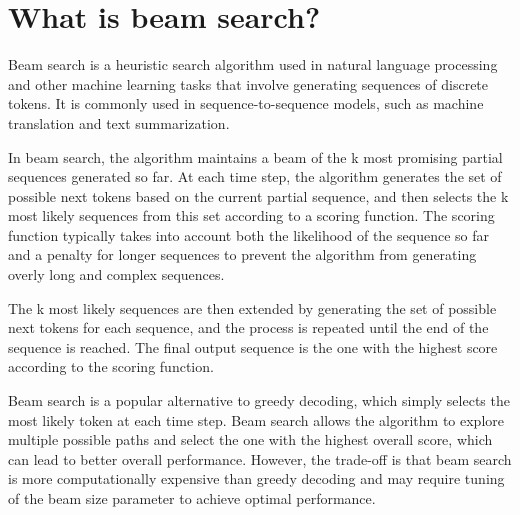\section{What is beam search?}
Beam search is a heuristic search algorithm used in natural language processing and other machine learning tasks that involve generating sequences of discrete tokens. It is commonly used in sequence-to-sequence models, such as machine translation and text summarization.

In beam search, the algorithm maintains a beam of the k most promising partial sequences generated so far. At each time step, the algorithm generates the set of possible next tokens based on the current partial sequence, and then selects the k most likely sequences from this set according to a scoring function. The scoring function typically takes into account both the likelihood of the sequence so far and a penalty for longer sequences to prevent the algorithm from generating overly long and complex sequences.

The k most likely sequences are then extended by generating the set of possible next tokens for each sequence, and the process is repeated until the end of the sequence is reached. The final output sequence is the one with the highest score according to the scoring function.

Beam search is a popular alternative to greedy decoding, which simply selects the most likely token at each time step. Beam search allows the algorithm to explore multiple possible paths and select the one with the highest overall score, which can lead to better overall performance. However, the trade-off is that beam search is more computationally expensive than greedy decoding and may require tuning of the beam size parameter to achieve optimal performance.

